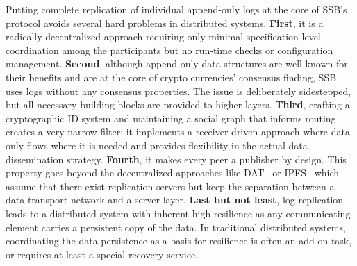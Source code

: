 \documentclass[9pt,sigconf]{acmart}
\begin{document}
Putting complete replication of individual append-only logs at the
core of SSB's protocol avoids several hard problems in distributed
systems. {\bf First}, it is a radically decentralized approach
requiring only minimal specification-level coordination among the
participants but no run-time checks or configuration
management.
{\bf Second}, although append-only
data structures are well known for their benefits and are at the core
of crypto currencies' consensus finding, SSB uses logs without any
consensus properties. The issue is deliberately sidestepped, but all
necessary building blocks are provided to higher layers.
{\bf Third}, crafting a cryptographic ID system and
maintaining a social graph that informs routing creates a very narrow
filter: it implements a receiver-driven approach where
data only flows where it is needed and provides flexibility in the actual data dissemination strategy.
{\bf Fourth}, it makes every peer a
publisher by design. This property goes beyond the decentralized
approaches like DAT~\cite{datproject} or IPFS~\cite{benet2014ipfs} which assume that there
exist replication servers but keep the separation between a data
transport network and a server layer.
{\bf Last but not least}, log replication leads to a
distributed system with inherent high resilience as any communicating
element carries a persistent copy of the data. In traditional distributed
systems, coordinating the data persistence as a basis for resilience
is often an add-on task, or requires at least a special recovery
service.
\end{document}
